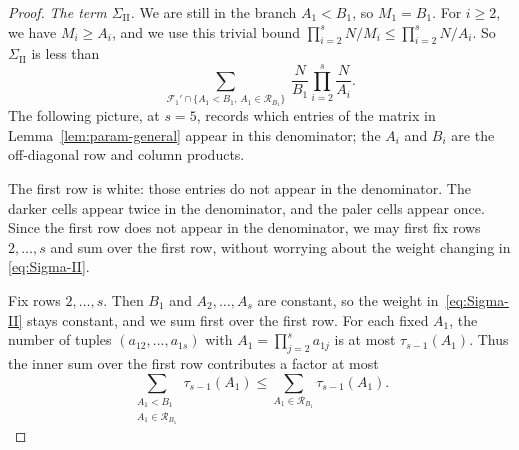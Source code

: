 \begin{proof}
\smallskip\noindent\emph{The term $\Sigma_{\mathrm{II}}$.}
We are still in the branch $A_1<B_1$, so $M_1=B_1$.
For $i\ge 2$, we have $M_i\ge A_i$, and we use this trivial bound  $\prod_{i=2}^sN/M_i\le \prod_{i=2}^s N/A_i$.
So $\Sigma_{\mathrm{II}}$ is less than
\begin{equation}\label{eq:Sigma-II}
\sum_{\mathscr{F}_1'\cap\{A_1<B_1,\,A_1\in\mathcal{R}_{B_1}\}}\ \frac{N}{B_1}\prod_{i=2}^s\frac{N}{A_i}.
\end{equation}
The following picture, at $s=5$, records which entries of the matrix in Lemma~\ref{lem:param-general} appear in this denominator; the $A_i$ and $B_i$ are the off-diagonal row and column products.
\begin{center}
\end{center}
The first row is white: those entries do not appear in the denominator.
The darker cells appear twice in the denominator, and the paler cells appear once.
Since the first row does not appear in the denominator, we may first fix rows $2,\ldots,s$ and sum over the first row, without worrying about the weight changing in \eqref{eq:Sigma-II}.

Fix rows $2,\ldots,s$. Then $B_1$ and $A_2,\ldots,A_s$ are constant, so the weight in~\eqref{eq:Sigma-II} stays constant, and we sum first over the first row.
For each fixed $A_1$, the number of tuples $(a_{12},\ldots,a_{1s})$ with $A_1=\prod_{j=2}^s a_{1j}$ is at most $\tau_{s-1}(A_1)$.
Thus the inner sum over the first row contributes a factor at most
\[
\sum_{\substack{A_1<B_1\\ A_1\in\mathcal{R}_{B_1}}}\tau_{s-1}(A_1)
\leq\sum_{A_1\in\mathcal{R}_{B_1}}\tau_{s-1}(A_1).
\]


\end{proof}
